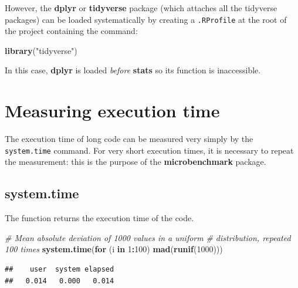 \documentclass[
  12pt,
  american,
  a4paper,
  extrafontsizes,onecolumn,openright
  ]{memoir}
\newenvironment{Shaded}{\begin{snugshade}}{\end{snugshade}}
\newcommand{\CommentTok}[1]{\textcolor[rgb]{0.56,0.35,0.01}{\textit{#1}}}
\newcommand{\ControlFlowTok}[1]{\textcolor[rgb]{0.13,0.29,0.53}{\textbf{#1}}}
\newcommand{\DecValTok}[1]{\textcolor[rgb]{0.00,0.00,0.81}{#1}}
\newcommand{\FunctionTok}[1]{\textcolor[rgb]{0.13,0.29,0.53}{\textbf{#1}}}
\newcommand{\NormalTok}[1]{#1}
\newcommand{\SpecialCharTok}[1]{\textcolor[rgb]{0.81,0.36,0.00}{\textbf{#1}}}
\newcommand{\StringTok}[1]{\textcolor[rgb]{0.31,0.60,0.02}{#1}}
\begin{document}
However, the \textbf{dplyr} or \textbf{tidyverse} package (which attaches all the tidyverse packages) can be loaded systematically by creating a \texttt{.RProfile} at the root of the project containing the command:

\scriptsize

\begin{Shaded}
\begin{Highlighting}[]
\FunctionTok{library}\NormalTok{(}\StringTok{"tidyverse"}\NormalTok{)}
\end{Highlighting}
\end{Shaded}

\normalsize

In this case, \textbf{dplyr} is loaded \emph{before} \textbf{stats} so its function is inaccessible.

\section{Measuring execution time}\label{measuring-execution-time}

The execution time of long code can be measured very simply by the \texttt{system.time} command.
For very short execution times, it is necessary to repeat the measurement: this is the purpose of the \textbf{microbenchmark} package.

\subsection{system.time}\label{system.time}

The function returns the execution time of the code.

\scriptsize

\begin{Shaded}
\begin{Highlighting}[]
\CommentTok{\# Mean absolute deviation of 1000 values in a uniform}
\CommentTok{\# distribution, repeated 100 times}
\FunctionTok{system.time}\NormalTok{(}\ControlFlowTok{for}\NormalTok{ (i }\ControlFlowTok{in} \DecValTok{1}\SpecialCharTok{:}\DecValTok{100}\NormalTok{) }\FunctionTok{mad}\NormalTok{(}\FunctionTok{runif}\NormalTok{(}\DecValTok{1000}\NormalTok{)))}
\end{Highlighting}
\end{Shaded}

\begin{verbatim}
##    user  system elapsed 
##   0.014   0.000   0.014
\end{verbatim}
\end{document}
